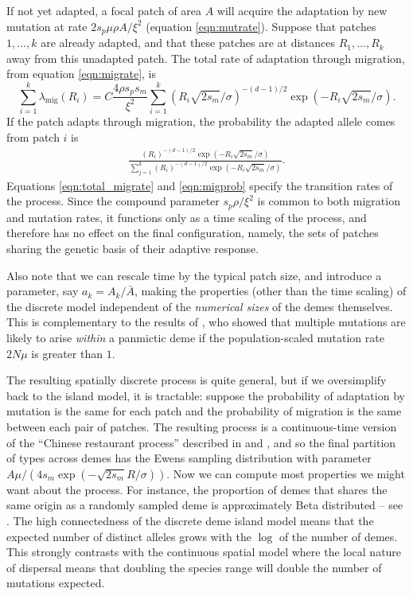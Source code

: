 \documentclass{article}
\newcommand{\citet}[1]{\cite{#1}}
\newcommand{\migrate}{\lambda_\text{mig}}
\begin{document}
If not yet adapted, a focal patch of area $A$ will acquire the adaptation by new mutation at rate $2 s_p \mu \rho A/\xi^2$ (equation \eqref{eqn:mutrate}).
Suppose that patches $1, \ldots, k$ are already adapted,
and that these patches are at distances $R_1, \ldots, R_k$ away from this unadapted patch.
The total rate of adaptation through migration, from equation \eqref{eqn:migrate}, is
\begin{equation} \label{eqn:total_migrate}
  \sum_{i=1}^k \migrate(R_i) = C \frac{ 4 \rho s_p s_m }{\xi^2} \sum_{i=1}^{k} \left(R_i \sqrt{2 s_m} /\sigma \right)^{-(d-1)/2} \exp\left(- R_i \sqrt{2 s_m} /\sigma\right).
\end{equation}
If the patch adapts through migration, the probability the adapted allele 
comes from patch $i$ is 
\begin{align}   \label{eqn:migprob}
  \frac{\left(R_i \right)^{-(d-1)/2} \exp\left(- R_i \sqrt{2 s_m}
  /\sigma\right)} {\sum_{j=1}^{k}  \left(R_i \right)^{-(d-1)/2} \exp\left(- R_i \sqrt{2 s_m}
    /\sigma\right) } .
\end{align}
Equations \eqref{eqn:total_migrate} and \eqref{eqn:migprob} specify the transition rates of the process.
Since the compound parameter $s_p \rho / \xi^2$ is common to both migration and mutation rates,
it functions only as a time scaling of the process, 
and therefore has no effect on the final configuration, namely, 
the sets of patches sharing the genetic basis of their adaptive response.

Also note that we can rescale time by the typical patch size, and introduce a parameter, say $a_k = A_k/\bar A$,
making the properties (other than the time scaling) of the discrete model independent of the \emph{numerical sizes} of the demes themselves.
This is complementary to the results of \cite{softsweepsII}, who showed that multiple mutations are likely to arise \emph{within} a panmictic deme
if the population-scaled mutation rate $2 N \mu$ is greater than $1$.

The resulting spatially discrete process is quite general,
but if we oversimplify back to the island model, it is tractable:
suppose the probability of adaptation by mutation is the same for each patch
and the probability of migration is the same between each pair of patches.
The resulting process is a continuous-time version of the ``Chinese restaurant process''
described in \citet{aldous1985exchangeability} and \citet{pitman1995partitions},
and so the final partition of types across demes has the Ewens
sampling distribution with parameter $A \mu / (4 s_m \exp (-\sqrt{2 s_m}R/\sigma))$.
Now we can compute most properties we might want about the process.
For instance, the proportion of demes that shares the same origin as a randomly sampled deme
is approximately Beta distributed -- see \cite{donnelly1989continuity}.
The high connectedness of the discrete deme island model means that the expected number of distinct alleles
grows with the $\log$ of the number of demes.
This strongly contrasts with the continuous spatial model 
where the local nature of dispersal means that doubling the species range will double the number of mutations expected. 
\end{document}
